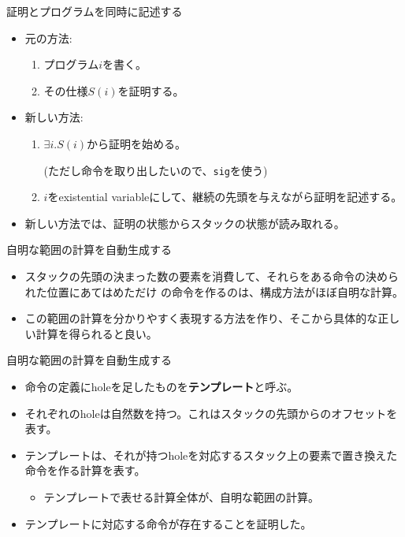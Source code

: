 \documentclass[cjk, 12pt, dvipdfm]{beamer}
\begin{document}
\begin{frame}{証明とプログラムを同時に記述する}

 \begin{itemize}
  \item 元の方法:
	\begin{enumerate}
	 \item プログラム$i$を書く。
	 \item その仕様$S(i)$を証明する。
	\end{enumerate}
  \item 新しい方法:
	\begin{enumerate}
	 \item $\exists i. S(i)$から証明を始める。

	       (ただし命令を取り出したいので、\texttt{sig}を使う)
	 \item $i$をexistential variableにして、継続の先頭を与えながら証明を記述する。
	\end{enumerate}
  \item 新しい方法では、証明の状態からスタックの状態が読み取れる。
 \end{itemize}

\end{frame}

\begin{frame}{自明な範囲の計算を自動生成する}

 \begin{itemize}
  \item スタックの先頭の決まった数の要素を消費して、それらをある命令の決められた位置にあてはめただけ
	の命令を作るのは、構成方法がほぼ自明な計算。
  \item この範囲の計算を分かりやすく表現する方法を作り、そこから具体的な正しい計算を得られると良い。
 \end{itemize}

\end{frame}

\begin{frame}{自明な範囲の計算を自動生成する}

 \begin{itemize}
  \item 命令の定義にholeを足したものを\textbf{テンプレート}と呼ぶ。
  \item それぞれのholeは自然数を持つ。これはスタックの先頭からのオフセットを表す。
  \item テンプレートは、それが持つholeを対応するスタック上の要素で置き換えた命令を作る計算を表す。
	\begin{itemize}
	 \item テンプレートで表せる計算全体が、自明な範囲の計算。
	\end{itemize}
  \item テンプレートに対応する命令が存在することを証明した。
 \end{itemize}

\end{frame}
\end{document}
